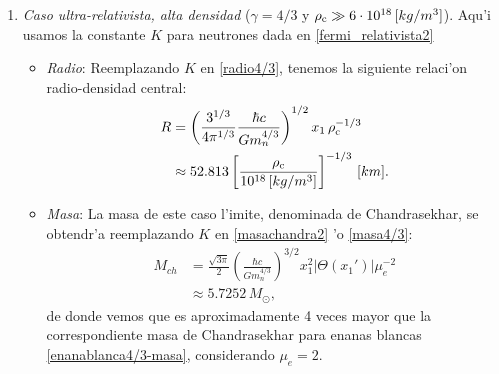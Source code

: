 \begin{enumerate}
 \item \emph{Caso ultra-relativista, alta densidad} ($\gamma=4/3$ y $\rho_{\rm c}\gg6\cdot10^{18}\,[kg/m^3]$). Aqu'i usamos la constante $K$ para neutrones dada en \eqref{fermi_relativista2}
\begin{itemize}
 \item \emph{Radio}: Reemplazando $K$ en \eqref{radio4/3}, tenemos la siguiente relaci'on radio-densidad central:
\begin{align}
R&=\left(\frac{3^{1/3}}{4\pi^{1/3}}\frac{\hbar c}{Gm_n^{4/3}}\right)^{1/2}x_1\,\rho_{\rm c}^{-1/3}\\
 &\approx52.813\left[\frac{\rho_{\rm c}}{10^{18}\,[kg/m^3]}\right]^{-1/3}\,[km].
\end{align}
\item \emph{Masa}: La masa de este caso l'imite, denominada de Chandrasekhar, se obtendr'a reemplazando $K$ en \eqref{masachandra2} 'o \eqref{masa4/3}:
\begin{align}\label{masachandra-neutrones}
M_{ch}&=\frac{\sqrt{3\pi}}{2}\left(\frac{\hbar c}{Gm_n^{4/3}}\right)^{3/2}x_1^2\left|\Theta(x_1')\right|\mu_e^{-2}\\
 &\approx5.7252\,M_{\odot},\label{neutrones4/3-masa}
\end{align}
de donde vemos que es aproximadamente 4 veces mayor que la correspondiente masa de Chandrasekhar para enanas blancas \eqref{enanablanca4/3-masa}, considerando $\mu_e=2$.
\end{itemize}


\end{enumerate}
